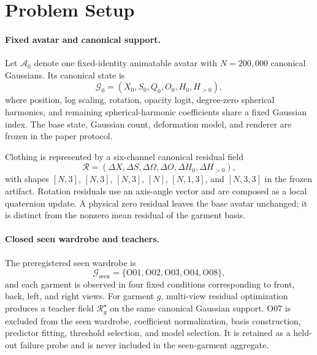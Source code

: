 \section{Problem Setup}

\paragraph{Fixed avatar and canonical support.}
Let $\mathcal{A}_0$ denote one fixed-identity animatable avatar with $N=200{,}000$ canonical Gaussians. Its canonical state is
\begin{equation}
\mathcal{G}_0=(X_0,S_0,Q_0,O_0,H_0,H_{>0}),
\end{equation}
where position, log scaling, rotation, opacity logit, degree-zero spherical harmonics, and remaining spherical-harmonic coefficients share a fixed Gaussian index. The base state, Gaussian count, deformation model, and renderer are frozen in the paper protocol.

Clothing is represented by a six-channel canonical residual field
\begin{equation}
\mathcal{R}=(\Delta X,\Delta S,\Delta\Omega,\Delta O,\Delta H_0,\Delta H_{>0}),
\end{equation}
with shapes $[N,3]$, $[N,3]$, $[N,3]$, $[N]$, $[N,1,3]$, and $[N,3,3]$ in the frozen artifact. Rotation residuals use an axis-angle vector and are composed as a local quaternion update. A physical zero residual leaves the base avatar unchanged; it is distinct from the nonzero mean residual of the garment basis.

\paragraph{Closed seen wardrobe and teachers.}
The preregistered seen wardrobe is
\begin{equation}
\mathcal{G}_{\mathrm{seen}}=\{\mathrm{O01},\mathrm{O02},\mathrm{O03},\mathrm{O04},\mathrm{O08}\},
\end{equation}
and each garment is observed in four fixed conditions corresponding to front, back, left, and right views. For garment $g$, multi-view residual optimization produces a teacher field $\mathcal{R}_g^{\star}$ on the same canonical Gaussian support. O07 is excluded from the seen wardrobe, coefficient normalization, basis construction, predictor fitting, threshold selection, and model selection. It is retained as a held-out failure probe and is never included in the seen-garment aggregate.

